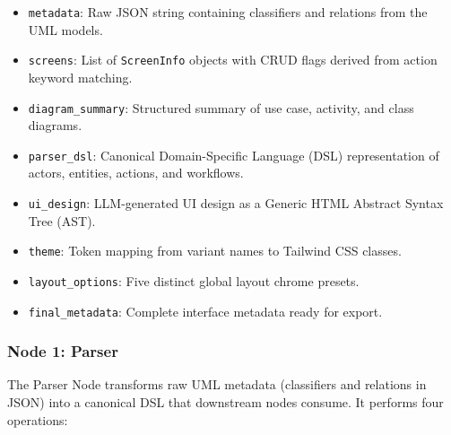 \begin{itemize}
    \item \texttt{metadata}: Raw JSON string containing classifiers and relations from the UML models.
    \item \texttt{screens}: List of \texttt{ScreenInfo} objects with CRUD flags derived from action keyword matching.
    \item \texttt{diagram\_summary}: Structured summary of use case, activity, and class diagrams.
    \item \texttt{parser\_dsl}: Canonical Domain-Specific Language (DSL) representation of actors, entities, actions, and workflows.
    \item \texttt{ui\_design}: LLM-generated UI design as a Generic HTML Abstract Syntax Tree (AST).
    \item \texttt{theme}: Token mapping from variant names to Tailwind CSS classes.
    \item \texttt{layout\_options}: Five distinct global layout chrome presets.
    \item \texttt{final\_metadata}: Complete interface metadata ready for export.
\end{itemize}


\subsubsection{Node 1: Parser}

The Parser Node transforms raw UML metadata (classifiers and relations in JSON) into a canonical DSL that downstream nodes consume. It performs four operations:

